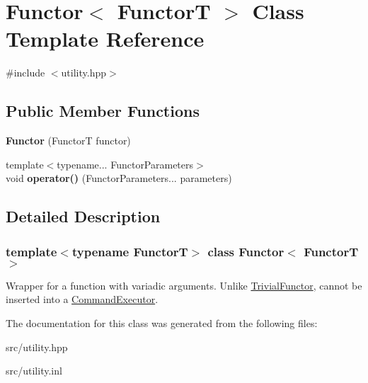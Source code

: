 \hypertarget{class_functor}{}\section{Functor$<$ FunctorT $>$ Class Template Reference}
\label{class_functor}


{\ttfamily \#include $<$utility.\+hpp$>$}

\subsection*{Public Member Functions}
\begin{DoxyCompactItemize}
\item 
\mbox{\label{class_functor_a46afbfc983b99a17fcf4a3275f2bf1df}} 
{\bfseries Functor} (FunctorT functor)
\item 
\mbox{\label{class_functor_a9d35b673ce8a5bcb2c130e852f214ac9}} 
{\footnotesize template$<$typename... Functor\+Parameters$>$ }\\void {\bfseries operator()} (Functor\+Parameters... parameters)
\end{DoxyCompactItemize}


\subsection{Detailed Description}
\subsubsection*{template$<$typename FunctorT$>$\newline
class Functor$<$ Functor\+T $>$}

Wrapper for a function with variadic arguments. Unlike \mbox{\hyperlink{class_trivial_functor}{Trivial\+Functor}}, cannot be inserted into a \mbox{\hyperlink{class_command_executor}{Command\+Executor}}. 

The documentation for this class was generated from the following files\+:\begin{DoxyCompactItemize}
\item 
src/utility.\+hpp\item 
src/utility.\+inl\end{DoxyCompactItemize}
